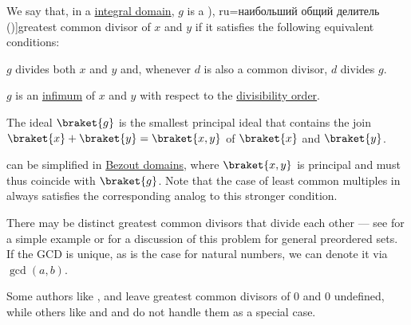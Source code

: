 \begin{definition}\label{def:gcd}
  We say that, in a \hyperref[def:integral_domain]{integral domain}, \( g \) is a \term[bg=най-голям общ делител (\cite[def. II.2]{ГеновМиховскиМоллов1991}), ru=наибольший общий делитель (\cite[def. 3.5.3]{Винберг2014})]{greatest common divisor} of \( x \) and \( y \) if it satisfies the following equivalent conditions:

  \begin{thmenum}
     \( g \) divides both \( x \) and \( y \) and, whenever \( d \) is also a common divisor, \( d \) divides \( g \).

     \( g \) is an \hyperref[def:extremal_points/supremum_and_infimum]{infimum} of \( x \) and \( y \) with respect to the \hyperref[thm:semiring_divisibility_order]{divisibility order}.

     The ideal \( \braket{ g } \) is the smallest principal ideal that contains the join \( \braket{ x } + \braket{ y } = \braket{ x, y } \) of \( \braket{ x } \) and \( \braket{ y } \).
  \end{thmenum}
\end{definition}
\begin{comments}
  \item {} can be simplified in \hyperref[def:bezout_domain]{Bezout domains}, where \( \braket{ x, y } \) is principal and must thus coincide with \( \braket{ g } \). Note that the case of least common multiples in  always satisfies the corresponding analog to this stronger condition.

  \item There may be distinct greatest common divisors that divide each other --- see  for a simple example or  for a discussion of this problem for general preordered sets. If the GCD is unique, as is the case for natural numbers, we can denote it via \( \gcd(a, b) \).

  \item Some authors like ,  and  leave greatest common divisors of \( 0 \) and \( 0 \) undefined, while others like  and  and  do not handle them as a special case.
\end{comments}
